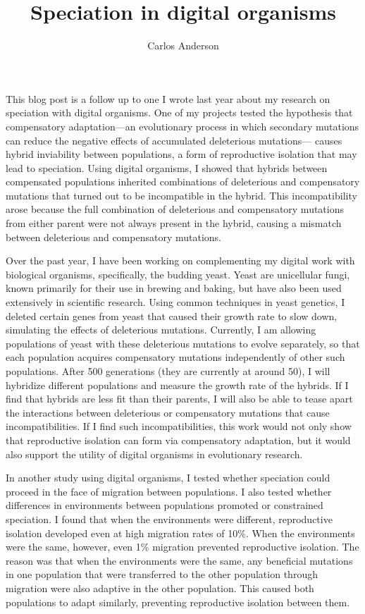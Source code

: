 \documentclass[12pt]{article}
\title{Speciation in digital organisms}
\author{Carlos Anderson}
\begin{document}
\maketitle

\baselineskip 24pt


This blog post is a follow up to one I wrote last year
about my research on speciation with digital organisms.
%
One of my projects tested the hypothesis that
compensatory adaptation---an evolutionary process
in which secondary mutations can reduce
the negative effects of accumulated deleterious mutations---%
causes hybrid inviability between populations,
a form of reproductive isolation that may lead to speciation.
%
Using digital organisms, I showed that hybrids
between compensated populations inherited combinations
of deleterious and compensatory mutations
that turned out to be incompatible in the hybrid.
%
This incompatibility arose because
the full combination of deleterious and compensatory mutations
from either parent were not always present in the hybrid,
causing a mismatch between deleterious and compensatory mutations.



Over the past year, I have been working on complementing
my digital work with biological organisms, specifically, the budding yeast.
%
Yeast are unicellular fungi,
known primarily for their use in brewing and baking,
but have also been used extensively in scientific research.
%
Using common techniques in yeast genetics,
I deleted certain genes from yeast that
caused their growth rate to slow down,
simulating the effects of deleterious mutations.
%
Currently, I am allowing populations of yeast
with these deleterious mutations to evolve separately,
so that each population acquires compensatory mutations
independently of other such populations.
%
After 500 generations (they are currently at around 50),
I will hybridize different populations
and measure the growth rate of the hybrids.
%
If I find that hybrids are less fit than their parents,
I will also be able to tease apart the interactions
between deleterious or compensatory mutations
that cause incompatibilities.
%
If I find such incompatibilities,
this work would not only show that reproductive isolation
can form via compensatory adaptation,
but it would also support the utility of digital organisms
in evolutionary research.



In another study using digital organisms,
I tested whether speciation could proceed
in the face of migration between populations.
%
I also tested whether differences in environments
between populations promoted or constrained speciation.
%
I found that when the environments were different,
reproductive isolation developed even at
high migration rates of 10\%.
%
When the environments were the same, however,
even 1\% migration prevented reproductive isolation.
%
The reason was that when the environments were the same,
any beneficial mutations in one population
that were transferred to the other population through migration
were also adaptive in the other population.
%
This caused both populations to adapt similarly,
preventing reproductive isolation between them.
\end{document}
